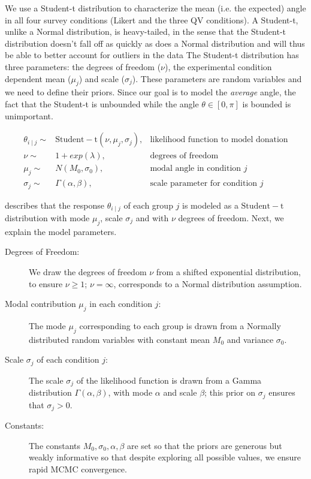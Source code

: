 We use a Student-t distribution to characterize the mean (i.e. the expected) angle in all four survey conditions (Likert and the three QV conditions). A Student-t, unlike a Normal distribution, is heavy-tailed, in the sense that the Student-t distribution doesn't fall off as quickly as does a Normal distribution and will thus be able to better account for outliers in the data {} The Student-t distribution has three parameters: the degrees of freedom ($\nu$), the experimental condition dependent mean ($\mu_j$) and scale ($\sigma_j$).  These parameters are random variables and we need to define their priors. Since our goal is to model the \textit{average} angle, the fact that the Student-t is unbounded while the angle $\theta \in [0, \pi]$ is bounded is unimportant.

\begin{align}
  \theta_{i \mid j} \sim & \mathrm{Student-t}(\nu, \mu_j, \sigma_j),   & \text{likelihood function to model donation} \label{eq:bayesian formulation} \\
  \nu \sim & 1 + exp(\lambda), & \text{degrees of freedom} \\
  \mu_j \sim & N(M_0, \sigma_0), & \text{modal angle in condition } j \\
  \sigma_j \sim & \Gamma(\alpha, \beta), & \text{scale parameter for condition } j
\end{align}
 
 describes that the response $\theta_{i \mid j}$ of each group $j$ is modeled as a $\mathrm{Student-t}$ distribution with mode $\mu_j$,  scale $\sigma_j$ and with $\nu$ degrees of freedom. Next, we explain the model parameters.


\begin{description}
    \item[Degrees of Freedom:] We draw the degrees of freedom $\nu$ from a shifted exponential distribution, to ensure $\nu \geq 1$; $\nu=\infty$, corresponds to a Normal distribution assumption.
    \item[Modal contribution $\mu_j$ in each condition $j$:] The mode $\mu_j$ corresponding to each group is drawn from a Normally distributed random variables with constant mean $M_0$ and variance $\sigma_0$. 
    \item[Scale $\sigma_j$ of each condition $j$:]  The scale $\sigma_j$ of the likelihood function is drawn from a Gamma distribution $\Gamma(\alpha, \beta)$, with mode $\alpha$ and scale $\beta$; this prior on $\sigma_j$ ensures that $\sigma_j > 0$. 
    \item[Constants:] The constants $M_0, \sigma_0, \alpha, \beta$ are set so that the priors are generous but weakly informative so that despite exploring all possible values, we ensure rapid MCMC convergence.
\end{description}

